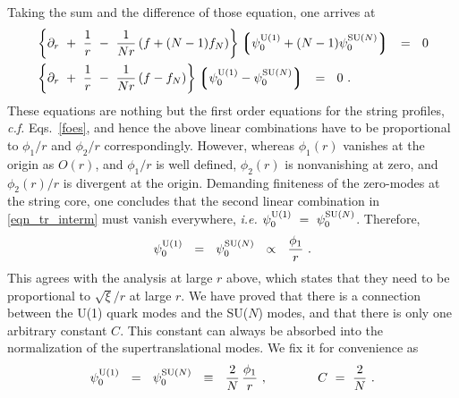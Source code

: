 \documentclass[12pt]{article}
\newcommand{\p}{\partial}
\newcommand{\lgr}{\left\lgroup}
\newcommand{\rgr}{\right\rgroup}
\newcommand{\poU}{\psi_0^{\rm U(1)}}
\newcommand{\poN}{\psi_0^\text{SU($N$)}}
\begin{document}
	Taking the sum and the difference of those equation, one arrives at
\begin{align}
%
\notag
&
	\left\{ \p_r ~+~ \frac{1}{r} ~-~ \frac{1}{Nr}\left(f + (N-1)f_N\right)\right\}
		\lgr \poU  + (N-1) \poN \rgr  ~~=~~ 0 
	\\
%
\label{eqn_tr_interm}
&
	\left\{ \p_r ~+~ \frac{1}{r} ~-~ \frac{1}{Nr}\left(f - f_N\right)\right\}
		\lgr \poU - \poN \rgr ~~=~~ 0~.
\end{align}
	These equations are nothing but the first order equations for the string profiles, {\it c.f.} Eqs.~\eqref{foes}, 
	and hence the above linear combinations have to be proportional to $ \phi_1/r $ and $ \phi_2/r $ correspondingly.
	However, whereas $ \phi_1(r) $ vanishes at the origin as $ O(r) $, and $ \phi_1/r $ is well defined, 
	$ \phi_2(r) $ is nonvanishing at zero, and $ \phi_2(r)/r $ is divergent at the origin.
	Demanding finiteness of the zero-modes at the string core, one concludes that the second linear combination
	in \eqref{eqn_tr_interm} must vanish everywhere, {\it i.e.} $ \poU ~=~ \poN $.
	Therefore, 
\[
	\poU ~~=~~ \poN ~~\propto~~ \frac{\phi_1}{r}~.
\]
	This agrees with the analysis at large $ r $ above, which states that they need to be proportional
	to $ \sqrt{\xi}/r $ at large $ r $.
	We have proved that there is a connection between the U(1) quark modes and the SU($N$) modes, and that 
	there is only one arbitrary constant $ C $.
	This constant can always be absorbed into the normalization of the supertranslational modes.
	We fix it for convenience as
\begin{equation}
\label{tail_strans}
	\poU ~~=~~ \poN ~~\equiv~~ \frac{2}{N}\, \frac{\phi_1}{r}~, \qquad\qquad  C ~=~ \frac{2}{N}~.
\end{equation}

\end{document}
